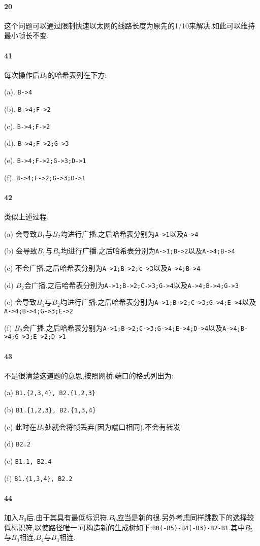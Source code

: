 \documentclass[a4paper]{article}
\begin{document}
\paragraph{20}
这个问题可以通过限制快速以太网的线路长度为原先的1/10来解决.如此可以维持最小帧长不变.
\paragraph{41}
每次操作后$B_2$的哈希表列在下方:

(a). \verb|B->4|

(b). \verb|B->4;F->2|

(c). \verb|B->4;F->2|

(d). \verb|B->4;F->2;G->3|

(e). \verb|B->4;F->2;G->3;D->1|

(f). \verb|B->4;F->2;G->3;D->1|
\paragraph{42}
类似上述过程.

(a) 会导致$B_1$与$B_2$均进行广播.之后哈希表分别为\verb|A->1|以及\verb|A->4|

(b) 会导致$B_1$与$B_2$均进行广播.之后哈希表分别为\verb|A->1;B->2|以及\verb|A->4;B->4|

(c) 不会广播.之后哈希表分别为\verb|A->1;B->2;c->3|以及\verb|A->4;B->4|

(d) $B_2$会广播.之后哈希表分别为\verb|A->1;B->2;C->3;G->4|以及\verb|A->4;B->4;G->3|

(e) 会导致$B_1$与$B_2$均进行广播.之后哈希表分别为\verb|A->1;B->2;C->3;G->4;E->4|以及\verb|A->4;B->4;G->3;E->2|

(f) $B_2$会广播.之后哈希表分别为\verb|A->1;B->2;C->3;G->4;E->4;D->4|以及\verb|A->4;B->4;G->3;E->2;D->1|
\paragraph{43}
不是很清楚这道题的意思,按照网桥.端口的格式列出为:

(a) \verb|B1.{2,3,4}, B2.{1,2,3}|

(b) \verb|B1.{1,2,3}, B2.{1,3,4}|

(c) 此时在$B_2$处就会将帧丢弃(因为端口相同),不会有转发

(d) \verb|B2.2|

(e) \verb|B1.1, B2.4|

(f) \verb|B1.{1,3,4}, B2.2|
\paragraph{44}
加入$B_0$后,由于其具有最低标识符,$B_0$应当是新的根.另外考虑同样跳数下的选择较低标识符,以使路径唯一.可构造新的生成树如下:\verb|B0(-B5)-B4(-B3)-B2-B1|.其中$B_5$与$B_0$相连,$B_4$与$B_3$相连.
\end{document}
